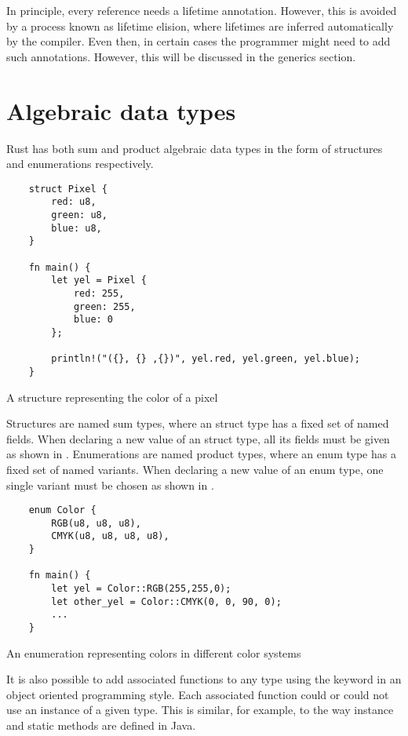 In principle, every reference needs a lifetime annotation. However, this is
avoided by a process known as lifetime elision, where lifetimes are inferred
automatically by the compiler. Even then, in certain cases the programmer might
need to add such annotations. However, this will be discussed in the generics
section.

\section{Algebraic data types}

Rust has both sum and product algebraic data types in the form of structures and
enumerations respectively.

\begin{listing}[H]
	\begin{verbatim}
    struct Pixel {
        red: u8,
        green: u8,
        blue: u8,
    }

    fn main() {
        let yel = Pixel {
            red: 255,
            green: 255,
            blue: 0
        };

        println!("({}, {} ,{})", yel.red, yel.green, yel.blue);
    }
    \end{verbatim}
  \caption{A structure representing the color of a pixel}
  \label{lst:struct}
\end{listing}

Structures are named sum types, where an struct type has a fixed set of named
fields. When declaring a new value of an struct type, all its fields must be
given as shown in . Enumerations are named product types, where
an enum type has a fixed set of named variants. When declaring a new value of an
enum type, one single variant must be chosen as shown in .

\begin{listing}[h]
	\begin{verbatim}
    enum Color {
        RGB(u8, u8, u8),
        CMYK(u8, u8, u8, u8),
    }

    fn main() {
        let yel = Color::RGB(255,255,0);
        let other_yel = Color::CMYK(0, 0, 90, 0);
        ...
    }
    \end{verbatim}
  \caption{An enumeration representing colors in different color systems}
  \label{lst:enum}
\end{listing}

It is also possible to add associated functions to any type using the
 keyword in an object oriented programming style. Each associated
function could or could not use an instance of a given type. This is similar,
for example, to the way instance and static methods are defined in Java.

